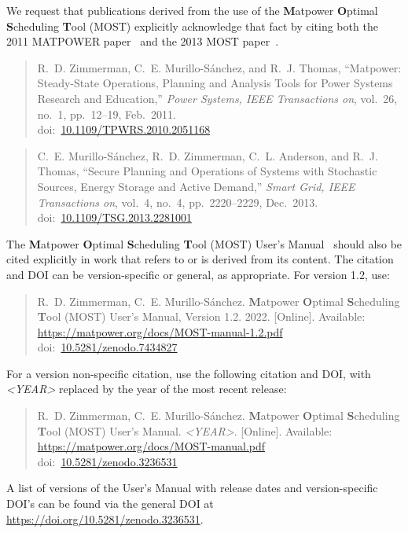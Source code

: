 \documentclass[12pt]{article}
\newcommand{\matpower}[0]{{\sc Matpower}}
\newcommand{\most}[0]{{MOST}}
\newcommand{\mostname}[0]{{{\bf M}{\sc atpower} \textbf{O}ptimal \textbf{S}cheduling \textbf{T}ool}}
\newcommand{\doi}[1]{doi:~\href{https://doi.org/#1}{#1}}
\numberwithin{equation}{section}
\numberwithin{table}{section}
\numberwithin{figure}{section}
\begin{document}
We request that publications derived from the use of the \mostname{} (\most{}) explicitly acknowledge that fact by citing both the 2011 MATPOWER paper~\cite{zimmerman2011} and the 2013 MOST paper~\cite{murillo-sanchez2013a}.

\begin{quote}
\footnotesize
R.~D. Zimmerman, C.~E. Murillo-S{\'a}nchez, and R.~J. Thomas, ``\matpower{}: Steady-State Operations, Planning and Analysis Tools for Power Systems Research and Education,'' \emph{Power Systems, IEEE Transactions on}, vol.~26, no.~1, pp.~12--19, Feb.~2011.\\
\doi{10.1109/TPWRS.2010.2051168}
\end{quote}

\begin{quote}
\footnotesize
C.~E. Murillo-S{\'a}nchez, R.~D. Zimmerman, C.~L. Anderson, and R.~J. Thomas, ``Secure Planning and Operations of Systems with Stochastic Sources, Energy Storage and Active Demand,'' \emph{Smart Grid, IEEE Transactions on}, vol.~4, no.~4, pp.~2220--2229, Dec.~2013.\\
\doi{10.1109/TSG.2013.2281001}
\end{quote}

The \mostname{} (\most) User's Manual~\cite{most_manual} should also be
cited explicitly in work that refers to or is derived from its content.
The citation and DOI can be version-specific or general, as appropriate.
For version 1.2, use:

\begin{quote}
\footnotesize
R.~D. Zimmerman, C.~E. Murillo-S{\'a}nchez. \mostname{} (\most{}) User's Manual, Version 1.2. 2022. [Online]. Available: \url{https://matpower.org/docs/MOST-manual-1.2.pdf}\\
\doi{10.5281/zenodo.7434827}
\end{quote}
For a version non-specific citation, use the following citation and DOI,
with \emph{\textless{}YEAR\textgreater{}} replaced by the year of the most recent release:

\begin{quote}
\footnotesize
R.~D. Zimmerman, C.~E. Murillo-S{\'a}nchez. \mostname{} (\most{}) User's Manual. \emph{\textless{}YEAR\textgreater{}}.
[Online]. Available: \url{https://matpower.org/docs/MOST-manual.pdf}\\
\doi{10.5281/zenodo.3236531}
\end{quote}
A list of versions of the User's Manual with release dates and
version-specific DOI's can be found via the general DOI at
\url{https://doi.org/10.5281/zenodo.3236531}.
\end{document}
